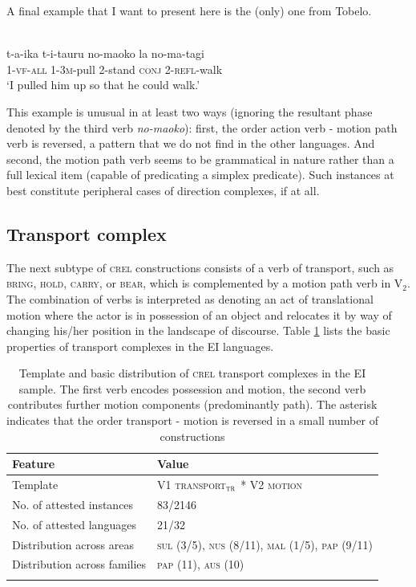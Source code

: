 A final example that I want to present here is the (only) one from Tobelo. 

\ea \label{Tobelo033}
\\
\gll t-a-ika t-i-tauru no-maoko la no-ma-tagi \\
\textsc{1}-\textsc{vf}-\textsc{all} \textsc{1}-\textsc{3}\textsc{m}-pull \textsc{2}-stand \textsc{conj} \textsc{2}-\textsc{refl}-walk \\
\glft `I pulled him up so that he could walk.' \\ 
\z

This example is unusual in at least two ways (ignoring the resultant phase denoted by the third verb \textit{no-maoko}): first, the order action verb - motion path verb is reversed, a pattern that we do not find in the other languages. And second, the motion path verb seems to be grammatical in nature rather than a full lexical item (capable of predicating a simplex predicate). Such instances at best constitute peripheral cases of direction complexes, if at all.

\subsection{Transport complex} \label{sec:transport}

The next subtype of \textsc{crel} constructions consists of a verb of transport, such as \textsc{bring}, \textsc{hold}, \textsc{carry}, or \textsc{bear}, which is complemented by a motion path verb in V$_2$. The combination of verbs is interpreted as denoting an act of translational motion where the actor is in possession of an object and relocates it by way of changing his/her position in the landscape of discourse. Table \ref{table:basiccreltransport} lists the basic properties of transport complexes in the EI languages. 

\begin{table}
\begin{tabular}{ll}
\lsptoprule
Feature&Value\tabularnewline
\midrule
Template&V1 \textsc{transport$_{\textsc{tr}}$} * V2 \textsc{motion}\tabularnewline
No. of attested instances& 83/2146 \tabularnewline
No. of attested languages& 21/32 \tabularnewline
Distribution across areas& \textsc{sul} (3/5), \textsc{nus} (8/11), \textsc{mal} (1/5), \textsc{pap} (9/11) \tabularnewline
Distribution across families& \textsc{pap} (11), \textsc{aus} (10) \tabularnewline
\lspbottomrule
\end{tabular}
\caption[Template and basic distribution of \textsc{crel} transport complexes]{Template and basic distribution of \textsc{crel} transport complexes in the EI sample. The first verb encodes possession and motion, the second verb contributes further motion components (predominantly path). The asterisk indicates that the order transport - motion is reversed in a small number of constructions}
\label{table:basiccreltransport}
\end{table}

